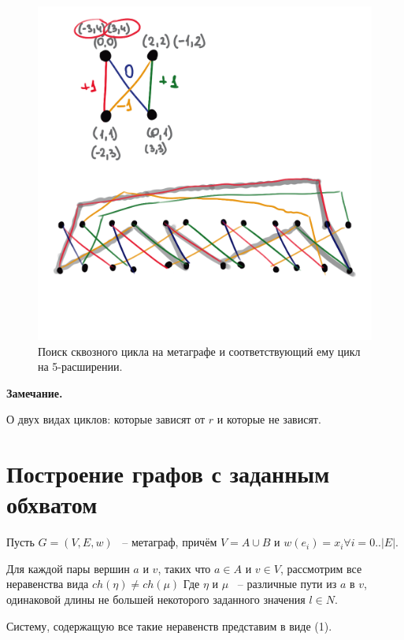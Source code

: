 \documentclass[14pt]{mmcs-article}
\begin{document}
\begin{figure}[H]
    \centering
    \includegraphics[scale=1.0]{cycle_mod_search.png}
    \caption{ Поиск сквозного цикла на метаграфе и соответствующий ему цикл на 5-расширении. }\label{cycle_mod_search}
\end{figure}


\textbf{Замечание.}


О двух видах циклов: которые зависят от $r$ и которые не зависят.

\pagebreak

\section*{Построение графов с заданным обхватом}

Пусть $G = ( V, E, w )$ ~-- метаграф, причём $V = A \cup B$ и $w(e_i) = x_i \forall i = 0..|E|$.

Для каждой пары вершин $a$ и $v$, таких что $a \in A$ и $v \in V$, рассмотрим все неравенства вида $ch(\eta) \neq ch(\mu)$ Где $\eta$ и $\mu$ ~-- различные пути из $a$ в $v$, одинаковой длины не большей некоторого заданного значения $l \in N$.

Систему, содержащую все такие неравенств представим в виде (1).
\end{document}
